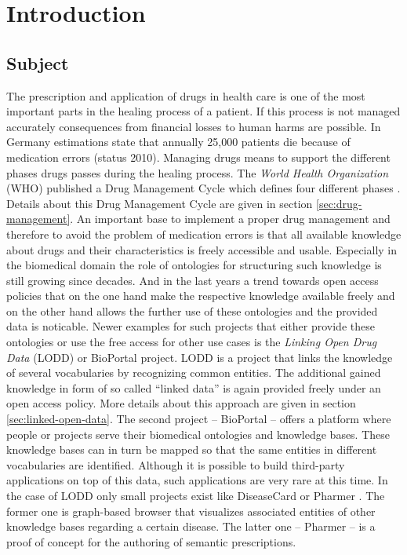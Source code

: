 \chapter{Introduction}
\label{cha:introduction-1}

\section{Subject}
\label{sec:subject}

The prescription and application of drugs in health care is one of the most important parts in the healing process of  a patient.
If this process is not managed accurately consequences from financial losses to  human harms are possible.
In Germany estimations state that annually 25,000 patients die because of medication errors \cite{pharzeit10} (status 2010).
Managing drugs means to support the different phases drugs passes during the healing process.
The \textit{World Health Organization} (WHO) published a Drug Management Cycle which defines four different phases \cite{who2004}.
Details about this Drug Management Cycle are given in section \ref{sec:drug-management}. 
An important base to implement a proper drug management and therefore to avoid the problem of medication errors is that all available knowledge about drugs and their characteristics is freely accessible and usable.
Especially in the biomedical domain the role of ontologies for structuring such knowledge is still growing since decades.
And in the last years a trend towards open access policies that on the one hand make the respective knowledge available freely and on the other hand allows the further use of these ontologies and the provided data is noticable.
Newer examples for such projects that either provide these ontologies or use the free access for other use cases is the \textit{Linking Open Drug Data} (LODD) \cite{jentzsch2009linking} or BioPortal \cite{whetzel2011bioportal} project.
LODD is a project that links the knowledge of several vocabularies by recognizing common entities.
The additional gained knowledge in form of so called ``linked data'' is again provided freely under an open access policy.
More details about this approach are given in section \ref{sec:linked-open-data}.
The second project -- BioPortal -- offers a platform where people or projects serve their biomedical ontologies and knowledge bases.
These knowledge bases can in turn be mapped so that the same entities in different vocabularies are identified.
Although it is possible to build third-party applications on top of this data, such applications are very rare at this time.
In the case of LODD only small projects exist like DiseaseCard \cite{oliveira2004diseasecard} or Pharmer \cite{khalili2013pharmer}.
The former one is graph-based browser that visualizes associated entities of other knowledge bases regarding a certain disease.
The latter one -- Pharmer -- is a proof of concept for the authoring of semantic prescriptions.

